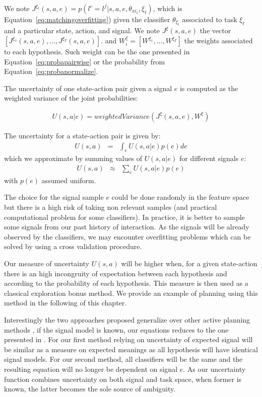 We note $J^{\xi_t}(s,a,e) = p(l^c = l^f | s, a, e, \theta_{xi_t}, \xi_t)$, which is Equation~\ref{eq:matchingoverfitting}) given the classifier $\theta_{\xi_t}$ associated to task $\xi_t$ and a particular state, action, and signal. We note $J^{\xi}(s,a,e)$ the vector $[J^{\xi_1}(s,a,e), \ldots, J^{\xi_T}(s,a,e)]$. and $W_{i}^{\xi} = [W^{\xi_1}, \ldots, W^{\xi_T}]$ the weights associated to each hypothesis. Such weight can be the one presented in Equation~\ref{eq:probapairwise} or the probability from Equation~\ref{eq:probanormalize}.

The uncertainty of one state-action pair given a signal $e$ is computed as the weighted variance of the joint probabilities:

\begin{eqnarray}
U(s,a|e) = weightedVariance(J^{\xi}(s,a,e), W^{\xi})
\label{eq:planningOneSignal}
\end{eqnarray}

The uncertainty for a state-action pair is given by:
\begin{eqnarray}
U(s,a) & = & \int_{e} U(s,a|e) p(e) de
\end{eqnarray}
which we approximate by summing values of $U(s,a|e)$ for different signals $e$:
\begin{eqnarray}
U(s,a) & \approx & \sum_{e} U(s,a|e) p(e)
\label{eq:planning}
\end{eqnarray}
with $p(e)$ assumed uniform. 

The choice for the signal sample $e$ could be done randomly in the feature space but there is a high risk of taking non relevant samples (and practical computational problem for some classifiers). In practice, it is better to sample some signals from our past history of interaction. As the signals will be already observed by the classifiers, we may encounter overfitting problems which can be solved by using a cross validation procedure.

Our measure of uncertainty $U(s,a)$ will be higher when, for a given state-action there is an high incongruity of expectation between each hypothesis and according to the probability of each hypothesis. This measure is then used as a classical exploration bonus method. We provide an example of planning using this method in the following of this chapter.

\transition

Interestingly the two approaches proposed generalize over other active planning methods \cite{lopes2009active}, if the signal model is known, our equations reduces to the one presented in \cite{macl11simul}. For our first method relying on uncertainty of expected signal will be similar as a measure on expected meanings as all hypothesis will have identical signal models. For our second method, all classifiers will be the same and the resulting equation will no longer be dependent on signal $e$. As our uncertainty function combines uncertainty on both signal and task space, when former is known, the latter becomes the sole source of ambiguity.

